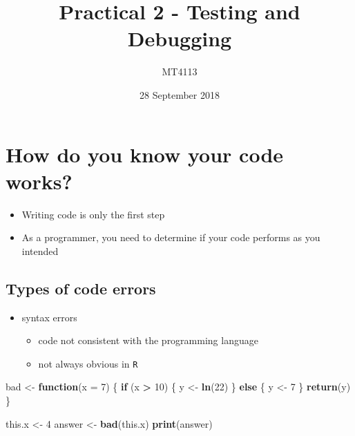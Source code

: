 \documentclass[]{article}
\title{Practical 2 - Testing and Debugging}
\author{MT4113}
\date{28 September 2018}
\newenvironment{Shaded}{\begin{snugshade}}{\end{snugshade}}
\newcommand{\KeywordTok}[1]{\textcolor[rgb]{0.13,0.29,0.53}{\textbf{#1}}}
\newcommand{\DataTypeTok}[1]{\textcolor[rgb]{0.13,0.29,0.53}{#1}}
\newcommand{\DecValTok}[1]{\textcolor[rgb]{0.00,0.00,0.81}{#1}}
\newcommand{\StringTok}[1]{\textcolor[rgb]{0.31,0.60,0.02}{#1}}
\newcommand{\ControlFlowTok}[1]{\textcolor[rgb]{0.13,0.29,0.53}{\textbf{#1}}}
\newcommand{\OperatorTok}[1]{\textcolor[rgb]{0.81,0.36,0.00}{\textbf{#1}}}
\newcommand{\NormalTok}[1]{#1}
\providecommand{\tightlist}{%
  \setlength{\itemsep}{0pt}\setlength{\parskip}{0pt}}
\begin{document}
\maketitle

\section{How do you know your code
works?}\label{how-do-you-know-your-code-works}

\begin{itemize}
\tightlist
\item
  Writing code is only the first step
\item
  As a programmer, you need to determine if your code performs as you
  intended
\end{itemize}

\subsection{Types of code errors}\label{types-of-code-errors}

\begin{itemize}
\tightlist
\item
  syntax errors

  \begin{itemize}
  \tightlist
  \item
    code not consistent with the programming language
  \item
    not always obvious in \texttt{R}
  \end{itemize}
\end{itemize}

\begin{Shaded}
\begin{Highlighting}[]
\NormalTok{bad <-}\StringTok{ }\ControlFlowTok{function}\NormalTok{(}\DataTypeTok{x =} \DecValTok{7}\NormalTok{) \{}
  \ControlFlowTok{if}\NormalTok{ (x }\OperatorTok{>}\StringTok{ }\DecValTok{10}\NormalTok{) \{}
\NormalTok{    y <-}\StringTok{ }\KeywordTok{ln}\NormalTok{(}\DecValTok{22}\NormalTok{)}
\NormalTok{  \} }\ControlFlowTok{else}\NormalTok{ \{}
\NormalTok{    y <-}\StringTok{ }\DecValTok{7}
\NormalTok{  \}}
  \KeywordTok{return}\NormalTok{(y)}
\NormalTok{\}}

\NormalTok{this.x <-}\StringTok{ }\DecValTok{4}
\NormalTok{answer <-}\StringTok{ }\KeywordTok{bad}\NormalTok{(this.x)}
\KeywordTok{print}\NormalTok{(answer)}
\end{Highlighting}
\end{Shaded}
\end{document}
